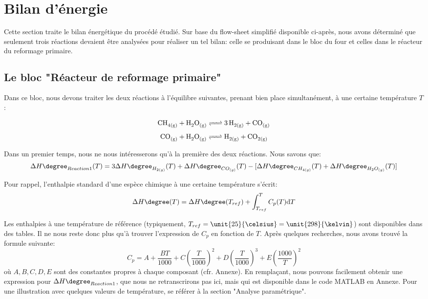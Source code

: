 
\section{Bilan d'énergie}

Cette section traite le bilan énergétique du procédé étudié.
Sur base du flow-sheet simplifié disponible ci-après, nous avons déterminé que seulement trois réactions
devaient être analysées pour réaliser un tel bilan: celle se produisant dans le bloc du four et celles dans 
le réacteur du reformage primaire.

\subsection{Le bloc "Réacteur de reformage primaire"}

Dans ce bloc, nous devons traiter les deux réactions à l'équilibre suivantes, prenant bien place simultanément, à une certaine température $T$:

\begin{equation}\label{eq:Reaction1}
\ce{CH_{4(g)} + H_{2}O_{(g)} <=> 3H_{2(g)} + CO_{(g)}}
\end{equation}
\begin{equation}\label{eq:Reaction2} {\ce{CO_{(g)} + H_{2}O_{(g)} <=>  H_{2(g)} + CO_{2(g)}}}
\end{equation}


\bigbreak
Dans un premier temps, nous ne nous intéresserons qu'à la première des deux réactions. Nous savons que:
$$\Delta H\degree_{Reaction1}(T)=3\Delta H\degree_{H_{2(g)}}(T) + \Delta H\degree_{CO_{(g)}}(T) -
\lbrack\Delta H\degree_{CH_{4(g)}}(T) + \Delta H\degree_{H_{2}O_{(g)}}(T)\rbrack$$

Pour rappel, l'enthalpie standard d'une espèce chimique à une certaine température s'écrit: \begin{equation}\label{eq:deltaH}
\Delta H\degree(T)=\Delta H\degree(T_{ref})  + \displaystyle \int_{T_{ref}}^{T} C_{p}(T) \mathrm{d}T
\end{equation}


Les enthalpies à une température de référence (typiquement, $T_{ref}=\unit{25}{\celsius}=\unit{298}{\kelvin}$) sont disponibles dans des tables. Il ne nous reste donc plus
qu'à trouver l'expression de $C_p$ en fonction de $T$.
Après quelques recherches\cite{NIST}, nous avons trouvé la formule suivante: \begin{equation}\label{eqref:capacite}
C_p=A+\dfrac{BT}{1000}+C\left(\dfrac{T}{1000}\right)^2+D\left(\dfrac{T}{1000}\right)^3+E\left(\dfrac{1000}{T}\right)^2
\end{equation} où $A,B,C,D,E$ sont des constantes propres à chaque composant (cfr. Annexe).
En remplaçant, nous pouvons facilement obtenir une expression pour $\Delta H\degree_{Reaction1}$, que nous ne retranscrirons pas
ici, mais qui est disponible dans le code \textsc{MATLAB} en Annexe. Pour une illustration avec quelques valeurs de 
température, se référer à la section "Analyse paramétrique".

